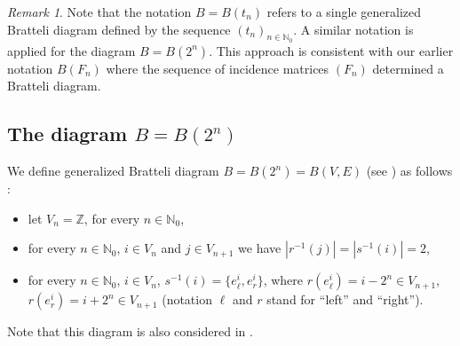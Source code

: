 \documentclass[11pt,reqno]{amsart}
\theoremstyle{definition}
\theoremstyle{remark}
\newtheorem{remark}[definition]{Remark}
\theoremstyle{plain}
\newcommand{\N}{\mathbb N}
\newcommand{\Z}{\mathbb Z}
\numberwithin{equation}{section}
\begin{document}
\begin{remark} Note that the notation $B=B(t_n)$ refers to a single generalized Bratteli diagram defined by the sequence $(t_n)_{n \in \N_0}$. A similar notation is applied for the diagram $B= B(2^n)$. 
This approach is consistent with our earlier notation $B(F_n)$ where the sequence of incidence matrices $(F_n)$ determined a Bratteli diagram.
\end{remark}


\subsection{The diagram $B=B(2^n)$}\label{ssect B(2n)} 

We define generalized Bratteli diagram $B=B(2^n) = B(V,E)$ (see ) as follows : 
\begin{itemize}
    \item let $V_n = \Z$, for every $n \in \N_0$,
    \item for every $n \in \N_0$, $i \in V_n$ and $j \in V_{n+1}$ we have $|r^{-1} (j)| = |s^{-1} (i)|=2$, 
\item for every $n \in \N_0$, $i \in V_n$, $s^{-1} (i) = \{e_{\ell}^i, e_r^i\}$, where $r(e_{\ell}^i) = i -2^n \in V_{n+1}$, $r(e_{r}^i) = i + 2^n \in V_{n+1}$ (notation $\ell$ and $r$ stand for ``left'' and ``right'').
\end{itemize} Note that this diagram is also considered in . 
\end{document}
